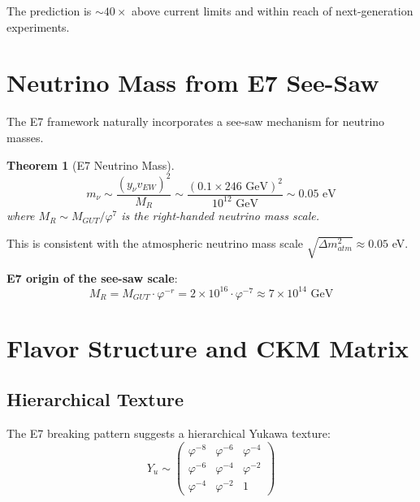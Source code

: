 \documentclass[11pt,a4paper]{article}
\newtheorem{theorem}{Theorem}
\begin{document}
The prediction is $\sim 40\times$ above current limits and within reach of next-generation experiments.

\section{Neutrino Mass from E7 See-Saw}

The E7 framework naturally incorporates a see-saw mechanism for neutrino masses.

\begin{theorem}[E7 Neutrino Mass]
\begin{equation}
m_\nu \sim \frac{(y_\nu v_{EW})^2}{M_R} \sim \frac{(0.1 \times 246 \text{ GeV})^2}{10^{12} \text{ GeV}} \sim 0.05 \text{ eV}
\end{equation}
where $M_R \sim M_{GUT}/\varphi^7$ is the right-handed neutrino mass scale.
\end{theorem}

This is consistent with the atmospheric neutrino mass scale $\sqrt{\Delta m^2_{atm}} \approx 0.05$ eV.

\textbf{E7 origin of the see-saw scale}:
\begin{equation}
M_R = M_{GUT} \cdot \varphi^{-r} = 2 \times 10^{16} \cdot \varphi^{-7} \approx 7 \times 10^{14} \text{ GeV}
\end{equation}

\section{Flavor Structure and CKM Matrix}

\subsection{Hierarchical Texture}

The E7 breaking pattern suggests a hierarchical Yukawa texture:
\begin{equation}
Y_u \sim \begin{pmatrix}
\varphi^{-8} & \varphi^{-6} & \varphi^{-4} \\
\varphi^{-6} & \varphi^{-4} & \varphi^{-2} \\
\varphi^{-4} & \varphi^{-2} & 1
\end{pmatrix}
\end{equation}
\end{document}
